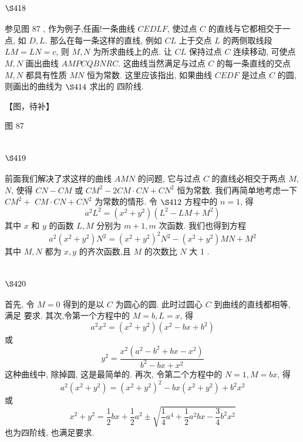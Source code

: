 \section{$\S 418$}

参见图 87 , 作为例子,任画!一条曲线 $C E D L F$, 使过点 $C$ 的直线与它都相交于一点, 如 $D, L$. 那么在每一条这样的直线, 例如 $C L$ 上于交点 $L$ 的两侧取线段 $L M=L N=c$, 则 $M, N$ 为所求曲线上的点. 让 $C L$ 保持过点 $C$ 连续移动, 可使点 $M, N$ 画出曲线 $A M P C Q B N R C$. 这曲线当然满足与过点 $C$ 的每一条直线的交点 $M, N$ 都具有性质 $M N$ 恒为常数. 这里应该指出, 如果曲线 $C E D F$ 是过点 $C$ 的圆,则画出的曲线为 $\S 414$ 求出的 四阶线.


【图，待补】

图 87

\section{$\S 419$}

前面我们解决了求这样的曲线 $A M N$ 的问题, 它与过点 $C$ 的直线必相交于两点 $M$, $N$, 使得 $C N-C M$ 或 $C M^{2}-2 C M \cdot C N+C N^{2}$ 恒为常数. 我们再简单地考虑一下 $C M^{2}+$ $C M \cdot C N+C N^{2}$ 为常数的情形. 令 $\S 412$ 方程中的 $n=1$, 得
\[
a^{2} L^{2}=\left(x^{2}+y^{2}\right)\left(L^{2}-L M+M^{2}\right)
\]
其中 $x$ 和 $y$ 的函数 $L, M$ 分别为 $m+1, m$ 次函数. 我们也得到方程
\[
a^{2}\left(x^{2}+y^{2}\right) N^{2}=\left(x^{2}+y^{2}\right)^{2} N^{2}-\left(x^{2}+y^{2}\right) M N+M^{2}
\]
其中 $M, N$ 都为 $x, y$ 的齐次函数,且 $M$ 的次数比 $N$ 大 1 .

\section{$\S 420$}

首先, 令 $M=0$ 得到的是以 $C$ 为圆心的圆. 此时过圆心 $C$ 到曲线的直线都相等, 满足 要求. 其次,令第一个方程中的 $M=b, L=x$, 得
\[
a^{2} x^{2}=\left(x^{2}+y^{2}\right)\left(x^{2}-b x+b^{2}\right)
\]
或
\[
y^{2}=\frac{x^{2}\left(a^{2}-b^{2}+b x-x^{2}\right)}{b^{2}-b x+x^{2}}
\]
这种曲线中, 除掉圆, 这是最简单的. 再次, 令第二个方程中的 $N=1, M=b x$, 得
\[
a^{2}\left(x^{2}+y^{2}\right)=\left(x^{2}+y^{2}\right)^{2}-b x\left(x^{2}+y^{2}\right)+b^{2} x^{2}
\]
或
\[
x^{2}+y^{2}=\frac{1}{2} b x+\frac{1}{2} a^{2} \pm \sqrt{\frac{1}{4} a^{4}+\frac{1}{2} a^{2} b x-\frac{3}{4} b^{2} x^{2}}
\]
也为四阶线, 也满足要求. 

